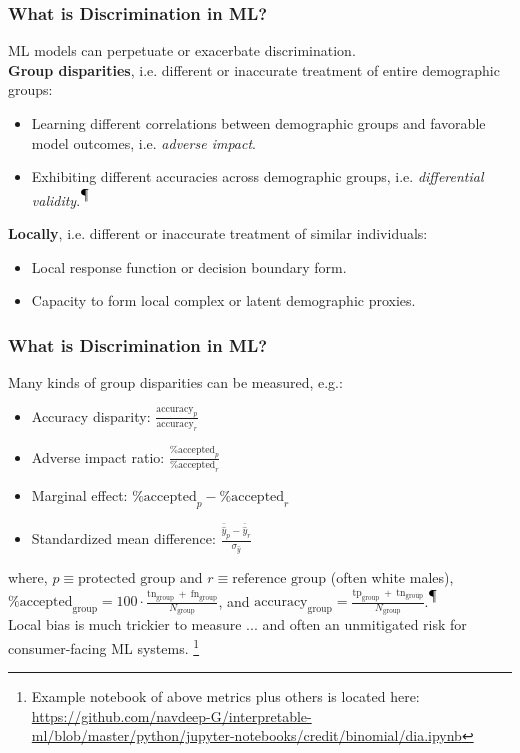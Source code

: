 \documentclass[11pt,
               		aspectratio=169,
               		hyperref={colorlinks}
               		]{beamer}
\begin{document}
		\begin{frame}				
			\frametitle{What is Discrimination in ML?}
			ML models can perpetuate or exacerbate discrimination.\\
			\vspace{10pt}
			\noindent \textbf{Group disparities}, i.e. different or inaccurate treatment of entire demographic groups:\\
			\begin{itemize}
				\item Learning different correlations between demographic groups and favorable model outcomes, i.e. \textit{adverse impact}.
				\item Exhibiting different accuracies across demographic groups, i.e. \textit{differential validity}.\textsuperscript{$\mathparagraph$}
			\end{itemize}
			\vspace{5pt}
			\noindent \textbf{Locally}, i.e. different or inaccurate treatment of similar individuals:\\
			\begin{itemize}
				\item Local response function or decision boundary form. 
				\item Capacity to form local complex or latent demographic proxies.
			\end{itemize}
		\end{frame}
		\begin{frame}				
			\frametitle{What is Discrimination in ML?}
			Many kinds of group disparities can be measured, e.g.:\\
			\begin{itemize}
				\item Accuracy disparity: $\frac{\text{accuracy}_p}{\text{accuracy}_r}$
				\item Adverse impact ratio: $\frac{\text{\% accepted}_p }{ \text{\% accepted}_r}$
				\item Marginal effect: $\text{\% accepted}_p - \text{\% accepted}_r$
				\item Standardized mean difference: $\frac{\bar{\hat{y}}_p - \bar{\hat{y}}_r}{\sigma_{\hat{y}}}$
			\end{itemize}
			\noindent where, $p \equiv \text{protected group}$ and $r \equiv \text{reference group}$ (often white males),\\
			\vspace{5pt}
			$\text{\% accepted}_\text{group} = 100 \cdot \frac{\text{tn}_\text{group}~+~\text{fn}_\text{group}}{N_\text{group}}$, and $\text{accuracy}_\text{group} = \frac{\text{tp}_\text{group}~+~\text{tn}_\text{group}}{N_\text{group}}$.\textsuperscript{$\mathparagraph$}\\
			\vspace{10pt}
			Local bias is much trickier to measure ... and often an unmitigated risk for consumer-facing ML systems.
			\footnote{\tiny{Example notebook of above metrics plus others is located here: \url{https://github.com/navdeep-G/interpretable-ml/blob/master/python/jupyter-notebooks/credit/binomial/dia.ipynb}}}
		\end{frame}		
\end{document}
